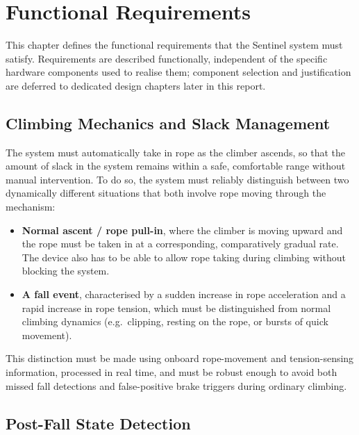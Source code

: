 
\chapter{Functional Requirements}
\label{ch:functional-requirements}

This chapter defines the functional requirements that the Sentinel system
must satisfy. Requirements are described functionally, independent of the
specific hardware components used to realise them; component selection and
justification are deferred to dedicated design chapters later in this
report.

\section{Climbing Mechanics and Slack Management}
\label{sec:fr-slack-management}

The system must automatically take in rope as the climber ascends, so
that the amount of slack in the system remains within a safe, comfortable
range without manual intervention. To do so, the system must reliably
distinguish between two dynamically different situations that both
involve rope moving through the mechanism:

\begin{itemize}
    \item \textbf{Normal ascent / rope pull-in}, where the climber is
        moving upward and the rope must be taken in at a corresponding,
        comparatively gradual rate. The device also has to be able to allow
        rope taking during climbing without blocking the system.
    \item \textbf{A fall event}, characterised by a sudden increase in
        rope acceleration and a rapid increase in rope
        tension, which must be distinguished from normal climbing
        dynamics (e.g.\ clipping, resting on the rope, or bursts of quick
        movement).
\end{itemize}

This distinction must be made using onboard rope-movement and
tension-sensing information, processed in real time, and must be robust
enough to avoid both missed fall detections and false-positive brake
triggers during ordinary climbing.

\section{Post-Fall State Detection}
\label{sec:fr-post-fall}

